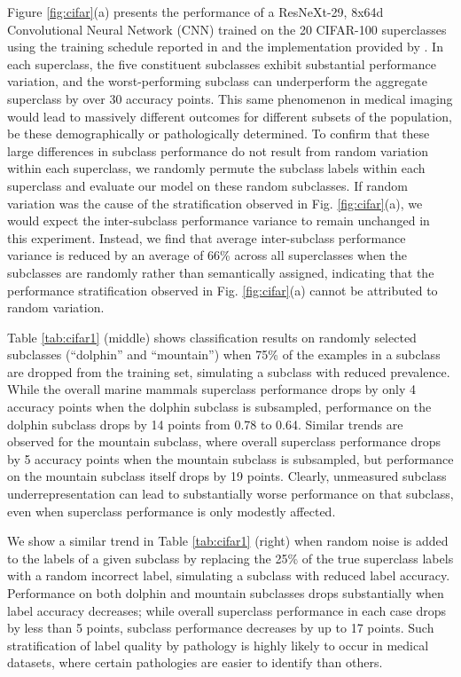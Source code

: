 \documentclass[sigconf]{acmart}
\begin{document}
 Figure \ref{fig:cifar}(a) presents the performance of a ResNeXt-29, 8x64d Convolutional Neural Network (CNN) trained on the 20 CIFAR-100 superclasses using the training schedule reported in \citep{Xie2016-ip} and the implementation provided by \citep{Yang_undated-bt}.  
In each superclass, the five constituent subclasses exhibit substantial performance variation, and the worst-performing subclass can underperform the aggregate superclass by over 30 accuracy points.  
This same phenomenon in medical imaging would lead to massively different outcomes for different subsets of the population, be these demographically or pathologically determined.
To confirm that these large differences in subclass performance do not result from random variation within each superclass, we randomly permute the subclass labels within each superclass and evaluate our model on these random subclasses.
If random variation was the cause of the stratification observed in Fig. \ref{fig:cifar}(a), we would expect the inter-subclass performance variance to remain unchanged in this experiment.
 Instead, we find that average inter-subclass performance variance is reduced by an average of 66\% across all superclasses when the subclasses are randomly rather than semantically assigned, indicating that the performance stratification observed in Fig. \ref{fig:cifar}(a) cannot be attributed to random variation.

 Table \ref{tab:cifar1} (middle) shows classification results on randomly selected subclasses (``dolphin'' and ``mountain'') when 75\% of the examples in a subclass are dropped from the training set, simulating a subclass with reduced prevalence.  
 While the overall marine mammals superclass performance drops by only 4 accuracy points when the dolphin subclass is subsampled, performance on the dolphin subclass drops by 14 points from 0.78 to 0.64.  
 Similar trends are observed for the mountain subclass, where overall superclass performance drops by 5 accuracy points when the mountain subclass is subsampled, but performance on the mountain subclass itself drops by 19 points.  
 Clearly, unmeasured subclass underrepresentation can lead to substantially worse performance on that subclass, even when superclass performance is only modestly affected.
 
We show a similar trend in Table \ref{tab:cifar1} (right) when random noise is added to the labels of a given subclass by replacing the 25\% of the true superclass labels with a random incorrect label, simulating a subclass with reduced label accuracy.
Performance on both dolphin and mountain subclasses drops substantially when label accuracy decreases; while overall superclass performance in each case drops by less than 5 points, subclass performance decreases by up to 17 points.  
Such stratification of label quality by pathology is highly likely to occur in medical datasets, where certain pathologies are easier to identify than others.
\end{document}
